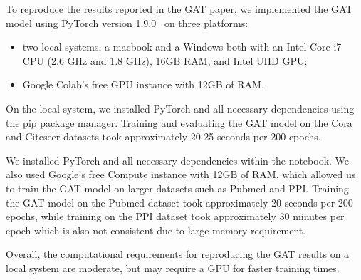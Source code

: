 To reproduce the results reported in the GAT paper, we implemented the GAT model using PyTorch version 1.9.0~\cite{paszke2019pytorch} on three platforms:
\begin{itemize}
    \item two local systems, a macbook and a Windows both with an Intel Core i7 CPU (2.6 GHz and 1.8 GHz), 16GB RAM,
    and Intel UHD GPU;
    \item Google Colab's free GPU instance with 12GB of RAM\@.
\end{itemize}

On the local system, we installed PyTorch and all necessary dependencies using the pip package manager.
Training and evaluating the GAT model on the Cora and Citeseer datasets took approximately 20-25 seconds per 200 epochs.

We installed PyTorch and all necessary dependencies within the notebook.
We also used Google's free Compute instance with 12GB of RAM, which allowed us to train the GAT model on larger
datasets such as Pubmed and PPI\@.
Training the GAT model on the Pubmed dataset took approximately 20 seconds per 200 epochs, while training on the PPI
dataset took approximately 30 minutes per epoch which is also not consistent due to large memory requirement.

Overall, the computational requirements for reproducing the GAT results on a local system are moderate, but may require a GPU for faster training times.
